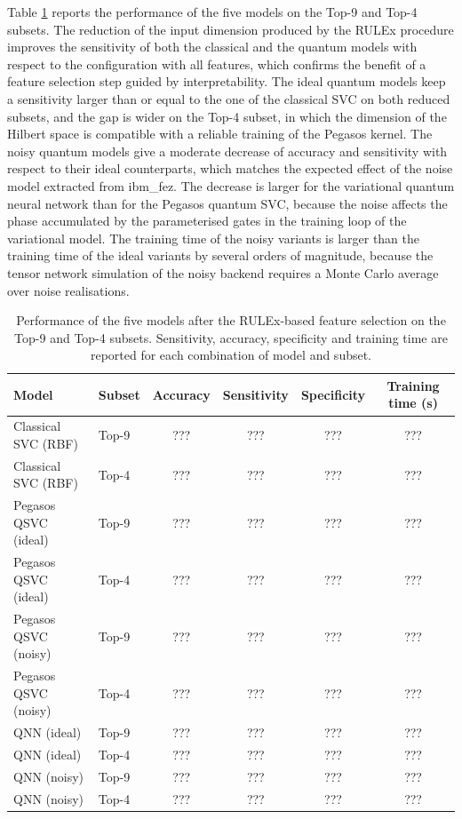Table \ref{tab:post_fs} reports the performance of the five models on the Top-9 and Top-4 subsets. The reduction of the input dimension produced by the RULEx procedure improves the sensitivity of both the classical and the quantum models with respect to the configuration with all features, which confirms the benefit of a feature selection step guided by interpretability. The ideal quantum models keep a sensitivity larger than or equal to the one of the classical SVC on both reduced subsets, and the gap is wider on the Top-4 subset, in which the dimension of the Hilbert space is compatible with a reliable training of the Pegasos kernel. The noisy quantum models give a moderate decrease of accuracy and sensitivity with respect to their ideal counterparts, which matches the expected effect of the noise model extracted from ibm\_fez. The decrease is larger for the variational quantum neural network than for the Pegasos quantum SVC, because the noise affects the phase accumulated by the parameterised gates in the training loop of the variational model. The training time of the noisy variants is larger than the training time of the ideal variants by several orders of magnitude, because the tensor network simulation of the noisy backend requires a Monte Carlo average over noise realisations.

\begin{table}[t]
\centering
\caption{Performance of the five models after the RULEx-based feature selection on the Top-9 and Top-4 subsets. Sensitivity, accuracy, specificity and training time are reported for each combination of model and subset.}
\label{tab:post_fs}
\setlength{\tabcolsep}{4pt}
\begin{tabular}{llcccc}
\hline
Model                    & Subset & Accuracy & Sensitivity & Specificity & Training time (s) \\
\hline
Classical SVC (RBF)      & Top-9 & ??? & ??? & ??? & ??? \\
Classical SVC (RBF)      & Top-4 & ??? & ??? & ??? & ??? \\
Pegasos QSVC (ideal)     & Top-9 & ??? & ??? & ??? & ??? \\
Pegasos QSVC (ideal)     & Top-4 & ??? & ??? & ??? & ??? \\
Pegasos QSVC (noisy)     & Top-9 & ??? & ??? & ??? & ??? \\
Pegasos QSVC (noisy)     & Top-4 & ??? & ??? & ??? & ??? \\
QNN (ideal)              & Top-9 & ??? & ??? & ??? & ??? \\
QNN (ideal)              & Top-4 & ??? & ??? & ??? & ??? \\
QNN (noisy)              & Top-9 & ??? & ??? & ??? & ??? \\
QNN (noisy)              & Top-4 & ??? & ??? & ??? & ??? \\
\hline
\end{tabular}
\end{table}

